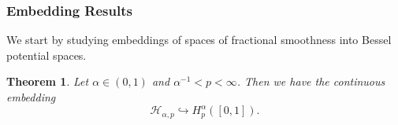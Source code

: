 \documentclass[12pt]{article}
\newtheorem{theorem}{Theorem}
\newcommand{\HH}{\mathcal{H}}
\newcommand{\red}[1]{\textcolor{red}{#1}}
\begin{document}
\subsubsection{Embedding Results} %

We start by studying embeddings of spaces of fractional smoothness into %
Bessel potential spaces.

\begin{theorem}\label{Winfried}
Let $\alpha\in (0,1)$ and $\alpha^{-1} < p < \infty$.
Then we have the continuous embedding
\begin{equation*}
\HH_{\alpha,p} \hookrightarrow H^\alpha_{p} ([0,1]).
\end{equation*}
\end{theorem}

\end{document}
